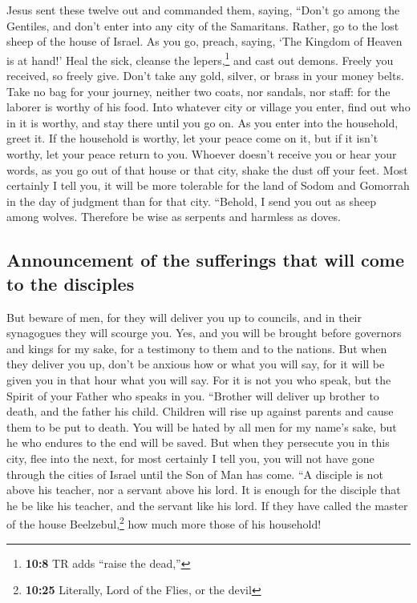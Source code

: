  Jesus sent these twelve out and commanded them, saying,
``Don't go among the Gentiles, and don't enter into any city of the
Samaritans.  Rather, go to the lost sheep of the house of
Israel.  As you go, preach, saying, `The Kingdom of Heaven
is at hand!'  Heal the sick, cleanse the
lepers,\footnote{\textbf{10:8} TR adds ``raise the dead,''} and cast out
demons. Freely you received, so freely give.  Don't take
any gold, silver, or brass in your money belts.  Take no
bag for your journey, neither two coats, nor sandals, nor staff: for the
laborer is worthy of his food.  Into whatever city or
village you enter, find out who in it is worthy, and stay there until
you go on.  As you enter into the household, greet it.
 If the household is worthy, let your peace come on it,
but if it isn't worthy, let your peace return to you. 
Whoever doesn't receive you or hear your words, as you go out of that
house or that city, shake the dust off your feet.  Most
certainly I tell you, it will be more tolerable for the land of Sodom
and Gomorrah in the day of judgment than for that city. 
``Behold, I send you out as sheep among wolves. Therefore be wise as
serpents and harmless as doves.

\hypertarget{announcement-of-the-sufferings-that-will-come-to-the-disciples}{%
\subsection{Announcement of the sufferings that will come to the
disciples}\label{announcement-of-the-sufferings-that-will-come-to-the-disciples}}

 But beware of men, for they will deliver you up to
councils, and in their synagogues they will scourge you. 
Yes, and you will be brought before governors and kings for my sake, for
a testimony to them and to the nations.  But when they
deliver you up, don't be anxious how or what you will say, for it will
be given you in that hour what you will say.  For it is
not you who speak, but the Spirit of your Father who speaks in you.
 ``Brother will deliver up brother to death, and the
father his child. Children will rise up against parents and cause them
to be put to death.  You will be hated by all men for my
name's sake, but he who endures to the end will be saved.
 But when they persecute you in this city, flee into the
next, for most certainly I tell you, you will not have gone through the
cities of Israel until the Son of Man has come.  ``A
disciple is not above his teacher, nor a servant above his lord.
 It is enough for the disciple that he be like his
teacher, and the servant like his lord. If they have called the master
of the house Beelzebul,\footnote{\textbf{10:25} Literally, Lord of the
  Flies, or the devil} how much more those of his household!

